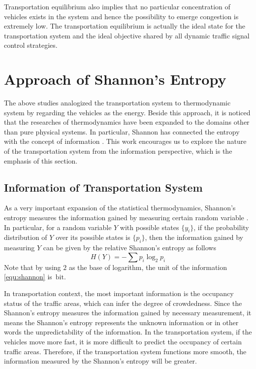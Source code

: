\documentclass[preprint,authoryear,12pt]{elsarticle}
\newcommand{\unit}[1]{\,\mathrm{#1}}
\begin{document}
Transportation equilibrium also implies that no particular concentration of vehicles exists in the system and hence the possibility to emerge congestion is extremely low. The transportation equilibrium is actually the ideal state for the transportation system and the ideal objective shared by all dynamic traffic signal control strategies.

\section{Approach of Shannon's Entropy}

The above studies analogized the transportation system to thermodynamic system by regarding the vehicles as the energy. Beside this approach, it is noticed that the researches of thermodynamics have been expanded to the domains other than pure physical systems. In particular, Shannon has connected the entropy with the concept of information \citep{Shannon1948}. This work encourages us to explore the nature of the transportation system from the information perspective, which is the emphasis of this section.

\subsection{Information of Transportation System}

As a very important expansion of the statistical thermodynamics, Shannon's entropy measures the information gained by measuring certain random variable \citep{Shannon1948}. In particular, for a random variable $Y$ with possible states $\{y_i\}$, if the probability distribution of $Y$ over its possible states is $\{p_i\}$, then the information gained by measuring $Y$ can be given by the relative Shannon's entropy as follows
\begin{equation}\label{equ:shannon}
H(Y) = -\sum p_i \log_2 p_i
\end{equation}
Note that by using $2$ as the base of logarithm, the unit of the information \eqref{equ:shannon} is $\unit{bit}$.

In transportation context, the most important information is the occupancy status of the traffic areas, which can infer the degree of crowdedness. Since the Shannon's entropy measures the information gained by necessary measurement, it means the Shannon's entropy represents the unknown information or in other words the unpredictability of the information. In the transportation system, if the vehicles move more fast, it is more difficult to predict the occupancy of certain traffic areas. Therefore, if the transportation system functions more smooth, the information measured by the Shannon's entropy will be greater.
\end{document}
